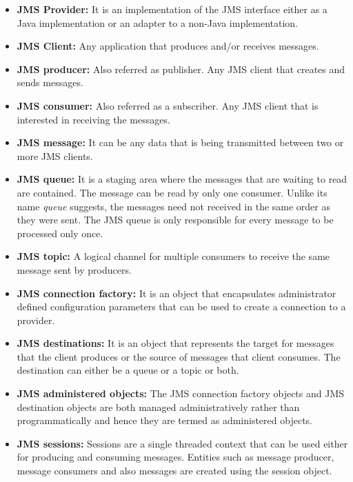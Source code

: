 \begin{itemize}
    \item \textbf{JMS Provider:}
          It is an implementation of the JMS interface either as a Java implementation or an adapter to a non-Java implementation. 

    \item \textbf{JMS Client:}
        Any application that produces and/or receives messages.

    \item \textbf{JMS producer:}
        Also referred as publisher. Any JMS client that creates and sends messages. 

    \item \textbf{JMS consumer:}
        Also referred as a subscriber. Any JMS client that is interested in receiving the messages.

    \item \textbf{JMS message:}
        It can be any data that is being transmitted between two or more JMS clients.

    \item \textbf{JMS queue:}
        It is a staging area where the messages that are waiting to read are contained. The message can be read by only one consumer. Unlike its name \textit{queue} suggests, the messages need not received in the same order as they were sent. The JMS queue is only responsible for every message to be processed only once.

    \item \textbf{JMS topic:}
        A logical channel for multiple consumers to receive the same message sent by producers.

    \item \textbf{JMS connection factory:}
        It is an object that encapsulates administrator defined configuration parameters that can be used to create a connection to a provider.

    \item \textbf{JMS destinations:}
        It is an object that represents the target for messages that the client produces or the source of messages that client consumes. The destination can either be a queue or a topic or both.

    \item \textbf{JMS administered objects:}
        The JMS connection factory objects and JMS destination objects are both managed administratively rather than programmatically and hence they are termed as administered objects.

    \item \textbf{JMS sessions:}
        Sessions are a single threaded context that can be used either for producing and consuming messages.
        Entities such as message producer, message consumers and also messages are created using the session object.

\end{itemize}

